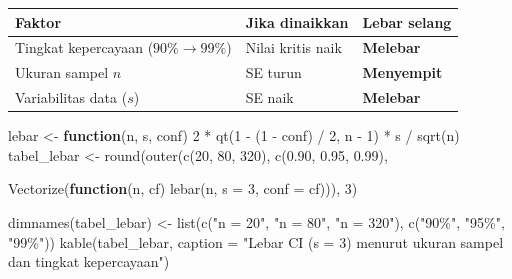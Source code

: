\documentclass[
  indonesian,
  letterpaper,
]{book}
\newenvironment{Shaded}{\begin{snugshade}}{\end{snugshade}}
\newcommand{\AttributeTok}[1]{\textcolor[rgb]{0.40,0.45,0.13}{#1}}
\newcommand{\ControlFlowTok}[1]{\textcolor[rgb]{0.00,0.23,0.31}{\textbf{#1}}}
\newcommand{\DecValTok}[1]{\textcolor[rgb]{0.68,0.00,0.00}{#1}}
\newcommand{\FloatTok}[1]{\textcolor[rgb]{0.68,0.00,0.00}{#1}}
\newcommand{\FunctionTok}[1]{\textcolor[rgb]{0.28,0.35,0.67}{#1}}
\newcommand{\NormalTok}[1]{\textcolor[rgb]{0.00,0.23,0.31}{#1}}
\newcommand{\OtherTok}[1]{\textcolor[rgb]{0.00,0.23,0.31}{#1}}
\newcommand{\SpecialCharTok}[1]{\textcolor[rgb]{0.37,0.37,0.37}{#1}}
\newcommand{\StringTok}[1]{\textcolor[rgb]{0.13,0.47,0.30}{#1}}
\newcounter{none} %
\begin{document}
{\def\LTcaptype{none} %
\begin{longtable}[]{@{}
  >{\raggedright\arraybackslash}p{}
  >{\raggedright\arraybackslash}p{}
  >{\raggedright\arraybackslash}p{}@{}}
\toprule\noalign{}
\begin{minipage}[b]{\linewidth}\raggedright
Faktor
\end{minipage} & \begin{minipage}[b]{\linewidth}\raggedright
Jika dinaikkan
\end{minipage} & \begin{minipage}[b]{\linewidth}\raggedright
Lebar selang
\end{minipage} \\
\midrule\noalign{}
\endhead
\bottomrule\noalign{}
\endlastfoot
Tingkat kepercayaan (\(90\% \to 99\%\)) & Nilai kritis naik &
\textbf{Melebar} \\
Ukuran sampel \(n\) & SE turun & \textbf{Menyempit} \\
Variabilitas data (\(s\)) & SE naik & \textbf{Melebar} \\
\end{longtable}
}

\begin{Shaded}
\begin{Highlighting}[]
\NormalTok{lebar }\OtherTok{\textless{}{-}} \ControlFlowTok{function}\NormalTok{(n, s, conf) }\DecValTok{2} \SpecialCharTok{*} \FunctionTok{qt}\NormalTok{(}\DecValTok{1} \SpecialCharTok{{-}}\NormalTok{ (}\DecValTok{1} \SpecialCharTok{{-}}\NormalTok{ conf) }\SpecialCharTok{/} \DecValTok{2}\NormalTok{, n }\SpecialCharTok{{-}} \DecValTok{1}\NormalTok{) }\SpecialCharTok{*}\NormalTok{ s }\SpecialCharTok{/} \FunctionTok{sqrt}\NormalTok{(n)}
\NormalTok{tabel\_lebar }\OtherTok{\textless{}{-}} \FunctionTok{round}\NormalTok{(}\FunctionTok{outer}\NormalTok{(}\FunctionTok{c}\NormalTok{(}\DecValTok{20}\NormalTok{, }\DecValTok{80}\NormalTok{, }\DecValTok{320}\NormalTok{), }\FunctionTok{c}\NormalTok{(}\FloatTok{0.90}\NormalTok{, }\FloatTok{0.95}\NormalTok{, }\FloatTok{0.99}\NormalTok{),}

\FunctionTok{Vectorize}\NormalTok{(}\ControlFlowTok{function}\NormalTok{(n, cf) }\FunctionTok{lebar}\NormalTok{(n, }\AttributeTok{s =} \DecValTok{3}\NormalTok{, }\AttributeTok{conf =}\NormalTok{ cf))), }\DecValTok{3}\NormalTok{)}

\FunctionTok{dimnames}\NormalTok{(tabel\_lebar) }\OtherTok{\textless{}{-}} \FunctionTok{list}\NormalTok{(}\FunctionTok{c}\NormalTok{(}\StringTok{"n = 20"}\NormalTok{, }\StringTok{"n = 80"}\NormalTok{, }\StringTok{"n = 320"}\NormalTok{), }\FunctionTok{c}\NormalTok{(}\StringTok{"90\%"}\NormalTok{, }\StringTok{"95\%"}\NormalTok{, }\StringTok{"99\%"}\NormalTok{))}
\FunctionTok{kable}\NormalTok{(tabel\_lebar, }\AttributeTok{caption =} \StringTok{"Lebar CI (s = 3) menurut ukuran sampel dan tingkat kepercayaan"}\NormalTok{)}
\end{Highlighting}
\end{Shaded}
\end{document}
